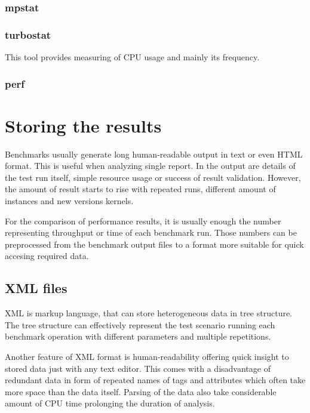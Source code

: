\subsection{mpstat}

\subsection{turbostat}
This tool provides measuring of CPU usage and mainly its frequency.

\subsection{perf}


\chapter{Storing the results}
Benchmarks usually generate long human-readable output in text or even HTML
format. This is useful when analyzing single report. In the output are details
of the test run itself, simple resource usage or success of result validation.
However, the amount of result starts to rise with repeated runs, different
amount of instances and new versions kernels.

For the comparison of performance results, it is usually enough the number
representing throughput or time of each benchmark run. Those numbers can be
preprocessed from the benchmark output files to a format more suitable for quick
accesing required data.

\section{XML files}
XML is markup language, that can store heterogeneous data in tree structure.
The tree structure can effectively represent the test scenario running each
benchmark operation with different parameters and multiple repetitions.

Another feature of XML format is human-readability offering quick insight to stored
data just with any text editor.
This comes with a disadvantage of redundant data in form of repeated names of
tags and attributes which often take more space than the data itself. Parsing of
the data also take considerable amount of CPU time prolonging the duration of
analysis.

